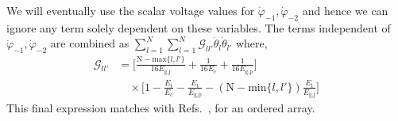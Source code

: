 \documentclass[%
reprint,
superscriptaddress,
 amsmath,amssymb,
 aps,
 prx,
longbibliography,
floatfix,
]{revtex4-2}
\begin{document}
We will eventually use the scalar voltage values for $\dot{\varphi}_{-1},\dot{\varphi}_{-2}$ and hence we can ignore any term solely dependent on these variables. The terms independent of $\dot{\varphi}_{-1},\dot{\varphi}_{-2}$ are combined as $\sum_{l=1}^{N}\sum_{l=1}^{N}\mathcal{G}_{ll'}\dot{\theta}_l\dot{\theta}_{l'}$ where,
\begin{align}
\mathcal{G}_{ll'}&=\Big[\frac{\textrm{N}-\text{max}\{l,l'\}}{16E_\textrm{g,j}}+\frac{1}{16E_\textrm{c}}+\frac{1}{16E_\textrm{g,p}}\Big]\nonumber\\&\quad\times\Big[1-\frac{E_\textrm{t}}{E_\textrm{c}}-\frac{E_\textrm{t}}{E_\textrm{g,p}}-(\textrm{N}-\text{min}\{l,l'\})\frac{E_\textrm{t}}{E_\textrm{g,j}}\Big]
\end{align}
This final expression matches with Refs.~\cite{ferguson2013symmetries,viola2015collective}, for an ordered array.
\end{document}
